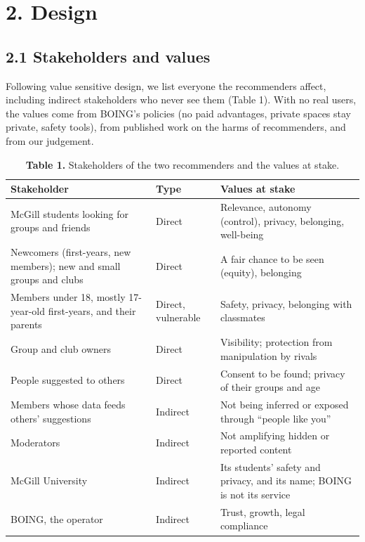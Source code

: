 \documentclass[11pt,letterpaper]{article}
\newcommand{\rowrule}{\midrule[0.2pt]}
\begin{document}
\section{2. Design}

\subsection{2.1 Stakeholders and values}

Following value sensitive design, we list everyone the recommenders affect, including indirect stakeholders
who never see them (Table 1). With no real users, the values come from BOING's policies (no paid advantages,
private spaces stay private, safety tools), from published work on the harms of recommenders, and from our
judgement.

\begin{table}[!htbp]
\centering
\caption*{\textbf{Table 1.} Stakeholders of the two recommenders and the values at stake.}
\scriptsize
\begin{tabular}{
  >{\raggedright\arraybackslash}p{}
  >{\raggedright\arraybackslash}p{}
  >{\raggedright\arraybackslash}p{}
}
\toprule
\textbf{Stakeholder} & \textbf{Type} & \textbf{Values at stake} \\
\midrule
McGill students looking for groups and friends & Direct & Relevance, autonomy (control), privacy, belonging, well-being \\
\rowrule
Newcomers (first-years, new members); new and small groups and clubs & Direct & A fair chance to be seen (equity), belonging \\
\rowrule
Members under 18, mostly 17-year-old first-years, and their parents & Direct, vulnerable & Safety, privacy, belonging with classmates \\
\rowrule
Group and club owners & Direct & Visibility; protection from manipulation by rivals \\
\rowrule
People suggested to others & Direct & Consent to be found; privacy of their groups and age \\
\rowrule
Members whose data feeds others' suggestions & Indirect & Not being inferred or exposed through ``people like you'' \\
\rowrule
Moderators & Indirect & Not amplifying hidden or reported content \\
\rowrule
McGill University & Indirect & Its students' safety and privacy, and its name; BOING is not its service \\
\rowrule
BOING, the operator & Indirect & Trust, growth, legal compliance \\
\bottomrule
\end{tabular}
\end{table}
\end{document}
